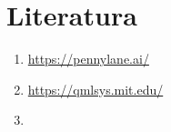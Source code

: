 \documentclass[a4paper,11pt]{article}
\begin{document}
\subsection{}

\subsection{}




\newpage 

\hypertarget{literatura}{%
\section*{Literatura}\label{literatura}}

\begin{enumerate}
\def\labelenumi{\arabic{enumi}.}

\item \url{https://pennylane.ai/}

\item \url{https://qmlsys.mit.edu/}

\item 
\end{enumerate}
\end{document}
